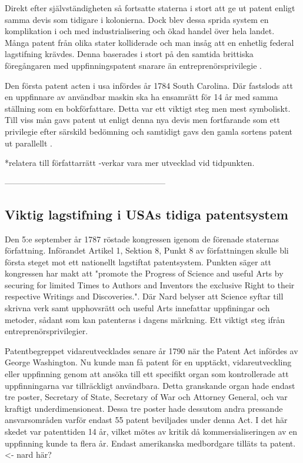Direkt efter självständigheten så fortsatte staterna i stort att ge ut patent enligt samma devis som tidigare i
kolonierna. Dock blev dessa sprida system en komplikation i och med industrialisering och ökad handel över
hela landet. Många patent från olika stater kolliderade och man insåg att en enhetlig federal
lagstifning krävdes. Denna baserades i stort på den samtida brittiska föregångaren med uppfinningspatent
snarare än entreprenörsprivilegie \cite{nard}.

Den första patent acten i usa infördes år 1784 South Carolina. Där fastslods att en uppfinnare av
användbar maskin ska ha ensamrätt för 14 år med samma ställning som en bokförfattare\cite{bracha}. Detta var ett viktigt steg men mest symboliskt. Till viss mån gavs patent ut enligt
denna nya devis men fortfarande som ett privilegie efter särskild bedömning och samtidigt gavs den gamla
sortens patent ut parallellt \cite{bracha}.

*relatera till författarrätt -verkar vara mer utvecklad vid tidpunkten.


-----------------------------------------------------------

\subsection{Viktig lagstifning i USAs tidiga patentsystem}

Den 5:e september år 1787 röstade kongressen igenom de förenade staternas författning. Införandet Artikel 1, Sektion 8, Punkt 8 av författningen skulle bli första steget mot ett nationellt lagstiftat patentsystem. Punkten säger att kongressen har
makt att "promote the Progress of Science and useful Arts by securing for limited Times to Authors and
Inventors the exclusive Right to their respective Writings and Discoveries.". Där Nard belyser att
Science syftar till skrivna verk samt upphovsrätt och useful Arts innefattar uppfiningar och metoder,
sådant som kan patenteras i dagens märkning\cite{nard}. Ett viktigt steg ifrån entreprenörsprivilegier.

Patentbegreppet vidareutvecklades senare år 1790 när the Patent Act infördes av George Washington. Nu
kunde man få patent för en upptäckt, vidareutveckling eller uppfinning genom att ansöka till ett
specifikt organ som kontrollerade att uppfinningarna var tillräckligt användbara\cite{nard}. Detta
granskande organ hade endast tre poster, Secretary of State, Secretary of War och Attorney General, och
var kraftigt underdimensioneat. Dessa tre poster hade dessutom andra pressande ansvarsområden varför
endast 55 patent beviljades under denna Act\cite{nard}. I det här skedet var patenttiden 14 år, vilket
mötes av kritik då kommersialiseringen av en uppfinning kunde ta flera år. Endast amerikanska
medbordgare tilläts ta patent\cite{nard}. <- nard här?

